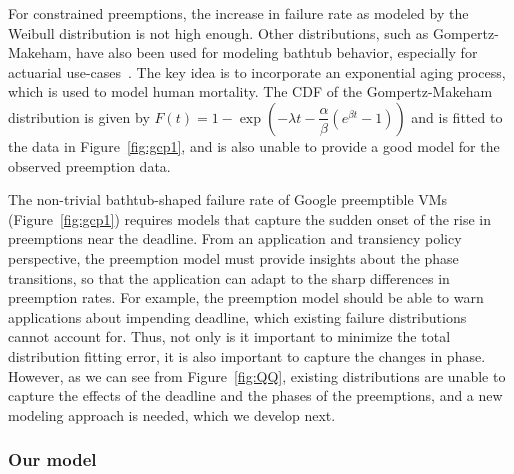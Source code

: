 For constrained preemptions, the increase in failure rate as modeled by the Weibull distribution is not high enough.
Other distributions, such as Gompertz-Makeham, have also been used for modeling bathtub behavior, especially  for actuarial use-cases~\cite{missov2013gompertz}. 
The key idea is to incorporate an exponential aging process, which is used to model human mortality.
The CDF of the Gompertz-Makeham distribution is given by $F(t) = 1 - \exp\left(-\lambda t - \dfrac{\alpha}{\beta}(e^{\beta t} - 1) \right)$
  and is fitted to the data in Figure~\ref{fig:gcp1}, and is also unable to provide a good model for the observed preemption data. 





The non-trivial bathtub-shaped failure rate of Google preemptible VMs (Figure~\ref{fig:gcp1}) requires models that capture the sudden onset of the rise in preemptions near the deadline.
From an application and transiency policy perspective, the preemption model must provide insights about the phase transitions, so that the application can adapt to the sharp differences in preemption rates.
%
For example, the preemption model should be able to warn applications about impending deadline, which existing failure distributions cannot account for. 
Thus, not only is it important to minimize the total distribution fitting error, it is also important to capture the changes in phase.
However, as we can see from Figure~\ref{fig:QQ}, existing distributions are unable to capture the effects of the deadline and the phases of the preemptions, and a new modeling approach is needed, which we develop next.  

\subsubsection{Our  model}
\label{subsec:preemption-model}



